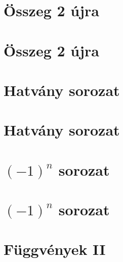 \begin{spacing}{1.4}
\section*{Összeg 2 újra} \label{DBmatlabia12}
\Fa{

}
\vspace{0.5cm}
\newpage
\section*{Összeg 2 újra} \label{DBmatlabia12Mo}
\Mo{

}
\vspace{0.5cm}
\newpage
\section*{Hatvány sorozat} \label{DBmatlabia13}
\Fa{

}
\vspace{0.5cm}
\newpage
\section*{Hatvány sorozat} \label{DBmatlabia13Mo}
\Mo{

}
\vspace{0.5cm}
\newpage
\section*{$(-1)^n$ sorozat} \label{DBmatlabia14}
\Fa{

}
\vspace{0.5cm}
\newpage
\section*{$(-1)^n$ sorozat} \label{DBmatlabia14Mo}
\Mo{

}
\vspace{0.5cm}
\newpage
\section*{Függvények II} \label{DBmatlabia15}
\Desc{

}
\vspace{0.5cm}
\newpage

\end{spacing}


